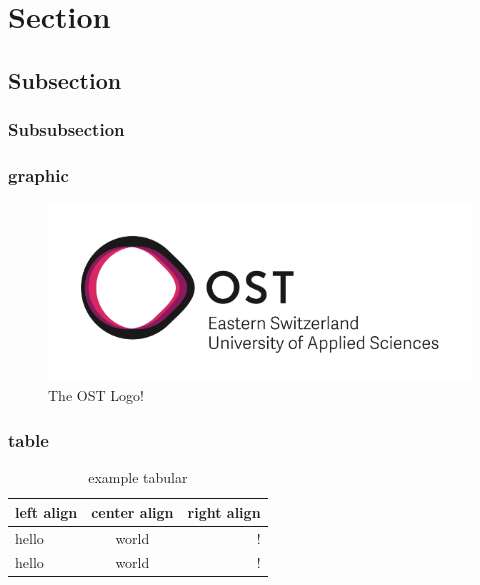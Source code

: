 

\section{Section}



\subsection{Subsection}


\subsubsection{Subsubsection}
\lipsum


\newpage

\subsubsection{graphic}
\begin{figure}[h]
    \centering
    \includegraphics[scale=0.5]{img/OST_Logo}
    \caption{The OST Logo!}
\end{figure}

\subsubsection{table}
\begin{table}[h]
    \centering
    \caption{example tabular}
    \label{tab:example tabular}
        \begin{tabular}{l | c | r}
            \hline
            left align & center align & right align\\ \hline
            \hline
            hello & world & !\\ \hline
            hello & world & !\\ \hline
        \end{tabular}
\end{table}

